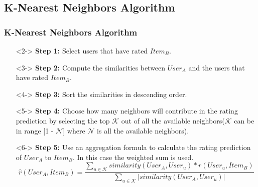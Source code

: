 \subsection{K-Nearest Neighbors Algorithm}
\begin{frame}
    \frametitle{K-Nearest Neighbors Algorithm}
    \vspace{-1cm}
    \begin{itemize}
	\item[]<2-> \textbf{Step 1:} Select users that have rated $Item_B$.
	\item[]<3-> \textbf{Step 2:} Compute the similarities between $User_A$ and the users that have
	rated $Item_B$.
	\item[]<4-> \textbf{Step 3:}  Sort the similarities in descending order.
	\item[]<5-> \textbf{Step 4:}  Choose how many neighbors will contribute in the rating
	prediction by selecting the top $\mathcal{K}$ out of all the available
	neighbors($\mathcal{K}$ can be in range [1 - $\mathcal{N}$] where $\mathcal{N}$ is all
	the available neighbors).
	\item[]<6-> \textbf{Step 5:} Use an aggregation formula to calculate the rating prediction of
	$User_A$ to $Item_B$. In this case the weighted sum is used.
\begin{equation*}
	\hat{r}(User_A,Item_B) = \frac{\sum_{u \in \mathcal{K}}{similarity(User_A,User_u) * r(User_u,Item_B)}}
						    {\sum_{u \in \mathcal{K}}{\mathopen|similarity(User_A,User_u)\mathclose|}}
\end{equation*}
\end{itemize}
\end{frame}

